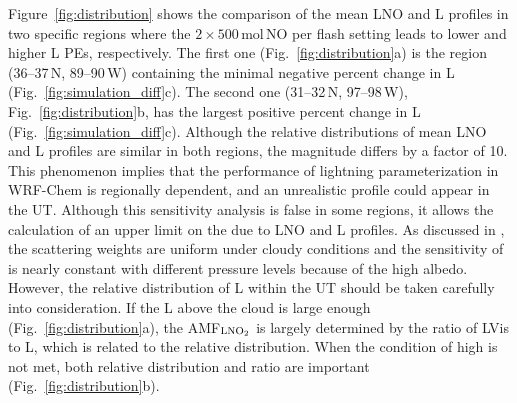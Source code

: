 \documentclass[amt]{copernicus}
\begin{document}
Figure~\ref{fig:distribution} shows the comparison of the mean LNO and L profiles in two specific regions where the $2\times500$\,mol\,NO per flash setting leads to lower and higher L PEs, respectively.
The first one (Fig.~\ref{fig:distribution}a) is the region (36--37{\degree}\,N, 89--90{\degree}\,W) containing the minimal negative percent change in L (Fig.~\ref{fig:simulation_diff}c).
The second one (31--32{\degree}\,N, 97--98{\degree}\,W), Fig.~\ref{fig:distribution}b, has the largest positive percent change in L (Fig.~\ref{fig:simulation_diff}c).
Although the relative distributions of mean LNO and L profiles are similar in both regions, the magnitude differs by a factor of 10.
This phenomenon implies that the performance of lightning parameterization in WRF-Chem is regionally dependent, and an unrealistic profile could appear in the UT.
Although this sensitivity analysis is false in some regions, it allows the calculation of an upper limit on the  due to LNO and L profiles.
As discussed in \citet{Laughner.2017}, the scattering weights are uniform under cloudy conditions and the sensitivity of  is nearly constant with different pressure levels because of the high albedo.
However, the relative distribution of L within the UT should be taken carefully into consideration.
If the L above the cloud is large enough (Fig.~\ref{fig:distribution}a), the AMF$_{\chem{LNO_2}}$ is largely determined by the ratio of LVis to L, which is related to the relative distribution.
When the condition of high  is not met, both relative distribution and ratio are important (Fig.~\ref{fig:distribution}b).
\end{document}
